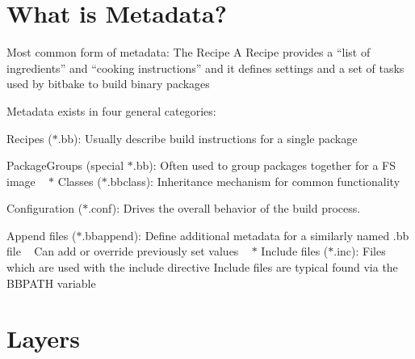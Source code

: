 \section*{What is Metadata?}

Most common form of metadata\+: The Recipe A Recipe provides a “list of ingredients” and “cooking instructions” and it defines settings and a set of tasks used by bitbake to build binary packages

Metadata exists in four general categories\+:
\begin{DoxyItemize}
\item Recipes ($\ast$.bb)\+: Usually describe build instructions for a single package
\item Package\+Groups (special $\ast$.bb)\+: Often used to group packages together for a FS image ~\newline
 $\ast$ Classes ($\ast$.bbclass)\+: Inheritance mechanism for common functionality
\item Configuration ($\ast$.conf)\+: Drives the overall behavior of the build process.
\item Append files ($\ast$.bbappend)\+: Define additional metadata for a similarly named .bb file ~\newline
 Can add or override previously set values ~\newline
 $\ast$ Include files ($\ast$.inc)\+: Files which are used with the include directive Include files are typical found via the B\+B\+P\+A\+TH variable
\end{DoxyItemize}

\section*{Layers}


